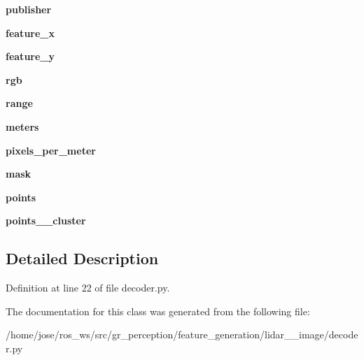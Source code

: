 \begin{DoxyCompactItemize}
{\bfseries publisher}
\item 
\mbox{\label{classdecoder_1_1ImageToPc_ab562f0a30d925e7d7c1364f62003217a}} 
{\bfseries feature\+\_\+x}
\item 
\mbox{\label{classdecoder_1_1ImageToPc_a97affd360cb08ba011d2475dcd7d9cfd}} 
{\bfseries feature\+\_\+y}
\item 
\mbox{\label{classdecoder_1_1ImageToPc_a6bc938511d74103a8efaaac6b22f0d49}} 
{\bfseries rgb}
\item 
\mbox{\label{classdecoder_1_1ImageToPc_ae0565f635aa556cf9ce52b4ccc3a1233}} 
{\bfseries range}
\item 
\mbox{\label{classdecoder_1_1ImageToPc_a7bdc948cd437d1465188312da8c7e498}} 
{\bfseries meters}
\item 
\mbox{\label{classdecoder_1_1ImageToPc_add556f381de273bda28e4c6cf50fc7cf}} 
{\bfseries pixels\+\_\+per\+\_\+meter}
\item 
\mbox{\label{classdecoder_1_1ImageToPc_aae77d9f9d60d0e96cc8285fa37b89cff}} 
{\bfseries mask}
\item 
\mbox{\label{classdecoder_1_1ImageToPc_ab96286ae2a6d632fbc53c504bd2977d2}} 
{\bfseries points}
\item 
\mbox{\label{classdecoder_1_1ImageToPc_aa58c6110a1831293c270d2241c2581c7}} 
{\bfseries points\+\_\+\_\+cluster}
\end{DoxyCompactItemize}


\subsection{Detailed Description}


Definition at line 22 of file decoder.\+py.



The documentation for this class was generated from the following file\+:\begin{DoxyCompactItemize}
\item 
/home/jose/ros\+\_\+ws/src/gr\+\_\+perception/feature\+\_\+generation/lidar\+\_\+\_\+image/decoder.\+py\end{DoxyCompactItemize}
